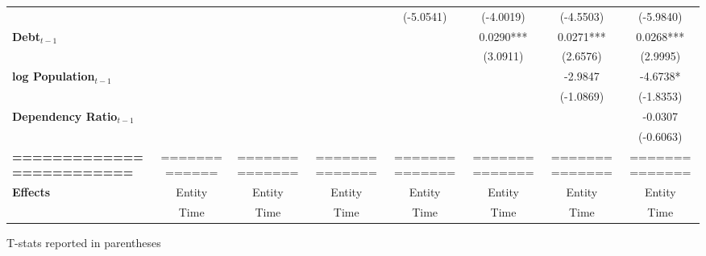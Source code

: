 \begin{center}
\begin{tabular}{lccccccc}
\textbf{ }                         &                   &                      &                           &     (-5.0541)      &    (-4.0019)    &         (-4.5503)         &          (-5.9840)            \\
\textbf{Debt$_{t-1}$}                &                   &                      &                           &                    &    0.0290***    &         0.0271***         &          0.0268***            \\
\textbf{ }                         &                   &                      &                           &                    &     (3.0911)    &          (2.6576)         &           (2.9995)            \\
\textbf{log Population$_{t-1}$}      &                   &                      &                           &                    &                 &          -2.9847          &           -4.6738*            \\
\textbf{ }                         &                   &                      &                           &                    &                 &         (-1.0869)         &          (-1.8353)            \\
\textbf{Dependency Ratio$_{t-1}$}   &                   &                      &                           &                    &                 &                           &           -0.0307             \\
\textbf{ }                         &                   &                      &                           &                    &                 &                           &          (-0.6063)            \\
\textbf{=========================} &   =============   &    ==============    &       ==============      &   ==============   &  ============== &       ==============      &        ==============         \\
\textbf{Effects}                   &       Entity      &        Entity        &           Entity          &       Entity       &      Entity     &           Entity          &            Entity             \\
\textbf{}                          &        Time       &         Time         &            Time           &        Time        &       Time      &            Time           &             Time              \\
\bottomrule
\end{tabular}
\end{center}

T-stats reported in parentheses